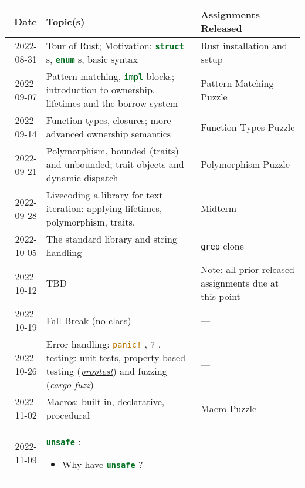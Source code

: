 \documentclass{article}
\newcommand{\code}[2][]{{\sloppy
\ifmmode
\text{\lstinline[language=rust,#1]`#2`}
\else
{\lstinline[language=rust,#1]`#2`}%
\fi}}
\begin{document}
\begin{longtable}{rp{}@{\hskip .05\textwidth}p{}}
    Date        & Topic(s)                          & Assignments Released  \\
    \toprule
    2022-08-31  & Tour of Rust; Motivation;
                  \code{struct}s, \code{enum}s, basic syntax
                & Rust installation and setup                               \\
    2022-09-07  & Pattern matching, \code{impl} blocks; introduction to
                  ownership, lifetimes and the borrow system
                & Pattern Matching Puzzle                                   \\
    2022-09-14  & Function types, closures; more advanced ownership semantics
                & Function Types Puzzle                                     \\
    2022-09-21  & Polymorphism, bounded (traits) and unbounded; trait objects
                  and dynamic dispatch
                & Polymorphism Puzzle                                       \\
    2022-09-28  & Livecoding a library for text iteration: applying lifetimes,
                  polymorphism, traits.
                & Midterm                                                   \\
    2022-10-05  & The standard library and string handling
                & \texttt{grep} clone                                       \\
    2022-10-12  & TBD
                & Note: all prior released assignments due at this point    \\
    2022-10-19  & Fall Break (no class)
                & ---                                                       \\
    2022-10-26  & Error handling: \code{panic!}, \code{?}, testing: unit tests,
                  property based testing
                  (\href{https://github.com/AltSysrq/proptest}{\textit{proptest}})
                  and fuzzing
                  (\href{https://github.com/rust-fuzz/cargo-fuzz}{\textit{cargo-fuzz}})
                & ---                                                       \\
    2022-11-02  & Macros: built-in, declarative, procedural
                & Macro Puzzle                                              \\
    2022-11-09  & \code{unsafe}: \begin{itemize}
                        \item Why have \code{unsafe}?

\end{itemize}
\end{longtable}
\end{document}
